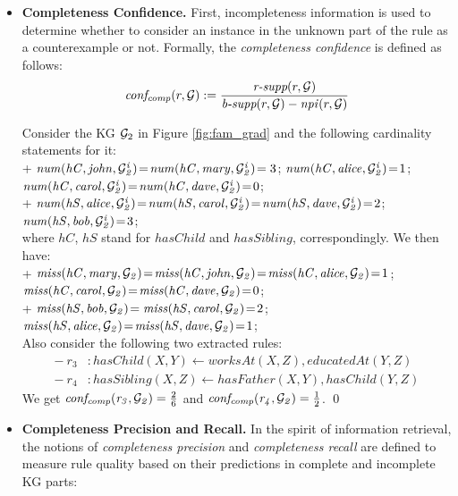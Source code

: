 \begin{itemize}

\item \textbf{Completeness Confidence.} First, incompleteness information is used to determine whether to consider an instance in the unknown part of the rule as a counterexample or not. Formally, the \emph{completeness confidence} is defined as follows:
\begin{align*}
\mathit{conf_{comp}}(r,\mathcal{G}) := \frac{\textit{r-supp}(r,\mathcal{G})}{\textit{b-supp}(r,\mathcal{G}) - \mathit{npi}(r,\mathcal{G})}
\end{align*}
\begin{example}
Consider the KG $\mathcal{G}_2$ in Figure \ref{fig:fam_grad}
and the following cardinality statements for it:\\
+ $\mathit{num(hC,john,\mathcal{G}^i_2)}\!=\!\mathit{num(hC,mary,\mathcal{G}^i_2)}\!=3$; $\mathit{num(hC,alice,\mathcal{G}^i_2)}\!=\!1$; $\mathit{num(hC,carol,\mathcal{G}^i_2)}\!=\!\mathit{num(hC,dave,\mathcal{G}^i_2)}\!=\!0$;\\
+ $\mathit{num(hS,alice,\mathcal{G}^i_2)}\!=\!\mathit{num(hS,carol,\mathcal{G}^i_2)}\!=\!\mathit{num(hS,dave,\mathcal{G}^i_2)}\!=\!2$;\\ $\mathit{num(hS,bob,\mathcal{G}^i_2)}\!=\!3$;\\
where $hC$, $hS$ stand for $hasChild$ and $hasSibling$, correspondingly. We then have:\\
+ $\mathit{miss(hC,mary,\mathcal{G}_2)}\!=\!\mathit{miss(hC,john,\mathcal{G}_2)}\!=\!\mathit{miss(hC,alice,\mathcal{G}_2)}\!=\!1$;\\ $\mathit{miss(hC,carol,\mathcal{G}_2)}\!=\!\mathit{miss(hC,dave,\mathcal{G}_2)}\!=\!0$;\\
+ $\mathit{miss(hS,bob,\mathcal{G}_2)}\!=\mathit{miss(hS,carol,\mathcal{G}_2)}\!=\!2$;\\$\mathit{miss(hS,alice,\mathcal{G}_2)}\!=\!\mathit{miss(hS,dave,\mathcal{G}_2)}\!=\!1$;\\
Also consider the following two extracted rules: 
\vspace{-\topsep}
\begin{align*}
-\ r_3 &: hasChild(X,Y) \leftarrow worksAt(X,Z), educatedAt(Y,Z)\\
-\ r_4 &: hasSibling(X,Z) \leftarrow hasFather(X,Y), hasChild(Y,Z)
\end{align*}
We get $\mathit{conf_{comp}(r_3, \mathcal{G}_2)}=\frac{2}{6}$ and $\mathit{conf_{comp}(r_4, \mathcal{G}_2)}=\frac{1}{2}$.
\qed
\end{example}
\item \textbf{Completeness Precision and Recall.} In the spirit of information retrieval, the notions of \emph{completeness precision} and \emph{completeness recall} are defined to measure rule quality based on their predictions in complete and incomplete KG parts:

\end{itemize}
